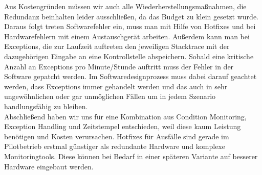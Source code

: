 Aus Kostengründen müssen wir auch alle Wiederherstellungsmaßnahmen, die Redundanz beinhalten leider ausschließen, da das Budget zu klein gesetzt wurde. Daraus folgt treten Softwarefehler ein, muss man mit Hilfe von Hotfixes und bei Hardwarefehlern mit einem Austauschgerät arbeiten. Außerdem kann man bei Exceptions, die zur Laufzeit auftreten den jeweiligen Stacktrace mit der dazugehörigen Eingabe an eine Kontrollstelle abspeichern. Sobald eine kritische Anzahl an Exceptions pro Minute/Stunde auftritt muss der Fehler in der Software gepatcht werden. Im Softwaredesignprozess muss dabei darauf geachtet werden, dass Exceptions immer gehandelt werden und das auch in sehr ungewöhnlichen oder gar unmöglichen Fällen um in jedem Szenario handlungsfähig zu bleiben.
\\
Abschließend haben wir uns für eine Kombination aus Condition Monitoring, Exception Handling und Zeitstempel entschieden, weil diese kaum Leistung benötigen und Kosten verursachen. Hotfixes für Ausfälle sind gerade im Pilotbetrieb erstmal günstiger als redundante Hardware und komplexe Monitoringtools. Diese können bei Bedarf in einer späteren Variante auf besserer Hardware eingebaut werden.
